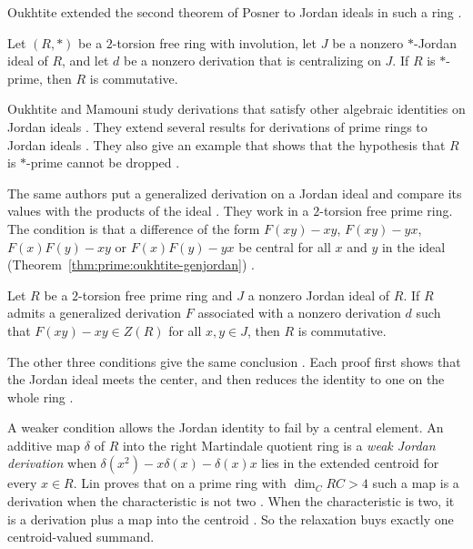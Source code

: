 Oukhtite extended the second theorem of Posner to Jordan ideals in such a ring
\cite[p.~415]{Oukhtite2011}.

\begin{theorem}\label{thm:prime:oukhtite-jordan}
Let $(R,*)$ be a $2$-torsion free ring with involution, let $J$ be a nonzero
$*$-Jordan ideal of $R$, and let $d$ be a nonzero derivation that is centralizing
on $J$. If $R$ is $*$-prime, then $R$ is commutative.
\end{theorem}

Oukhtite and Mamouni study derivations that satisfy other algebraic identities on
Jordan ideals \cite[p.~341]{OukhtiteMamouni2012}. They extend several results for
derivations of prime rings to Jordan ideals \cite[p.~341]{OukhtiteMamouni2012}.
They also give an example that shows that the hypothesis that $R$ is $*$-prime
cannot be dropped \cite[p.~341]{OukhtiteMamouni2012}.

The same authors put a generalized derivation on a Jordan ideal and compare its
values with the products of the ideal \cite[p.~1]{OukhtiteMamouni2015}. They work
in a $2$-torsion free prime ring. The condition is that a difference of the form
$F(xy)-xy$, $F(xy)-yx$, $F(x)F(y)-xy$ or $F(x)F(y)-yx$ be central for all $x$ and
$y$ in the ideal (Theorem~\ref{thm:prime:oukhtite-genjordan}) \cite[p.~1]{OukhtiteMamouni2015}.

\begin{theorem}\label{thm:prime:oukhtite-genjordan}
Let $R$ be a $2$-torsion free prime ring and $J$ a nonzero Jordan ideal of $R$. If
$R$ admits a generalized derivation $F$ associated with a nonzero derivation $d$
such that $F(xy)-xy\in Z(R)$ for all $x,y\in J$, then $R$ is commutative.
\end{theorem}

The other three conditions give the same conclusion
\cite[Theorems~2 and~3, pp.~3--5]{OukhtiteMamouni2015}. Each proof first shows that
the Jordan ideal meets the center, and then reduces the identity to one on the whole
ring \cite[pp.~3--4]{OukhtiteMamouni2015}.

A weaker condition allows the Jordan identity to fail by a central element. An
additive map $\delta$ of $R$ into the right Martindale quotient ring is a
\emph{weak Jordan derivation} \cite[p.~1]{Lin2020WeakJordan} when
$\delta(x^{2})-x\delta(x)-\delta(x)x$ lies in the extended centroid for every
$x\in R$. Lin proves that on a prime ring with $\dim_{C}RC>4$ such a map is a
derivation when the characteristic is not two \cite[Theorem~1.2]{Lin2020WeakJordan}.
When the characteristic is two, it is a derivation plus a map into the centroid
\cite[Theorem~1.2]{Lin2020WeakJordan}. So the relaxation buys exactly one
centroid-valued summand.

